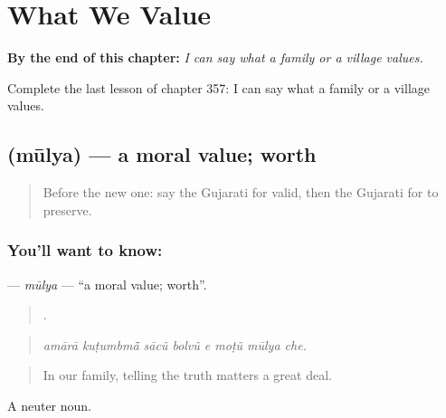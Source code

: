 
\chapter{What We Value}
\label{ch:gu-what-we-value}

\begin{chapteropening}
\textbf{By the end of this chapter:} \emph{I can say what a family or a village values.}

Complete the last lesson of chapter 357: I can say what a family or a village values.
\end{chapteropening}

\section[\texorpdfstring{\gu{મૂલ્ય} (mūlya)}{મૂલ્ય (mūlya)}]{ (mūlya) — a moral value; worth}

\label{lesson:GU-C357-mulya}



\begin{quote}
Before the new one: say the Gujarati for valid, then the Gujarati for to preserve.
\end{quote}

\subsection*{You'll want to know: }
\textbf{} — \emph{mūlya} — \textquotedblleft{}a moral value; worth\textquotedblright{}.

\begin{quote}
       .
\end{quote}

\begin{quote}
\emph{amārā kuṭumbmā̃ sācũ bolvũ e moṭũ mūlya che.}
\end{quote}

\begin{quote}
In our family, telling the truth matters a great deal.
\end{quote}

A neuter noun.

